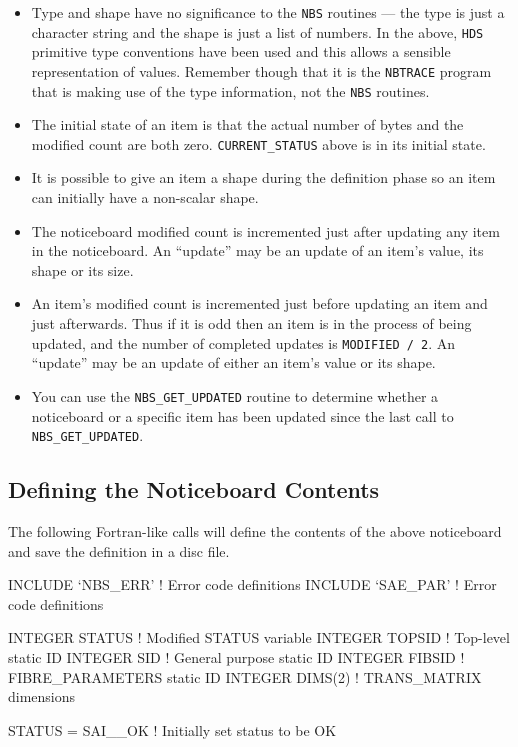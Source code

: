 \documentclass[twoside,11pt,nolof]{starlink}
\begin{document}
\begin {itemize}
\item Type and shape have no significance to the \texttt{NBS} routines --- the type
is just a character string and the shape is just a list of numbers. In the
above, \texttt{HDS} primitive type conventions have been used and this allows a
sensible representation of values. Remember though that it is the \texttt{NBTRACE}
program that is making use of the type information, not the \texttt{NBS} routines.
\item The initial state of an item is that the actual number of bytes and the
modified count are both zero. \texttt{CURRENT\_STATUS} above is in its initial
state.
\item It is possible to give an item a shape during the definition phase so an
item can initially have a non-scalar shape.
\item The noticeboard modified count is incremented just after updating any
item in the noticeboard. An ``update'' may be an update of an item's value, its
shape or its size.
\item An item's modified count is incremented just before updating an item
and just afterwards. Thus if it is odd then an item is in the process of
being updated, and the number of completed updates is \texttt{MODIFIED~/~2}. An
``update'' may be an update of either an item's value or its shape.
\item You can use the \texttt{NBS\_GET\_UPDATED} routine to determine whether
a noticeboard or a specific item has been updated since the last call to \texttt{NBS\_GET\_UPDATED}.
\end {itemize}

\subsection {Defining the Noticeboard Contents}

The following Fortran-like calls will define the contents of the above
noticeboard and save the definition in a disc file.

\begin{terminalv}
INCLUDE   `NBS_ERR'       ! Error code definitions
INCLUDE   `SAE_PAR'       ! Error code definitions

INTEGER   STATUS          ! Modified STATUS variable
INTEGER   TOPSID          ! Top-level static ID
INTEGER   SID             ! General purpose static ID
INTEGER   FIBSID          ! FIBRE_PARAMETERS static ID
INTEGER   DIMS(2)         ! TRANS_MATRIX dimensions

STATUS = SAI__OK          ! Initially set status to be OK
\end{terminalv}
\end{document}
